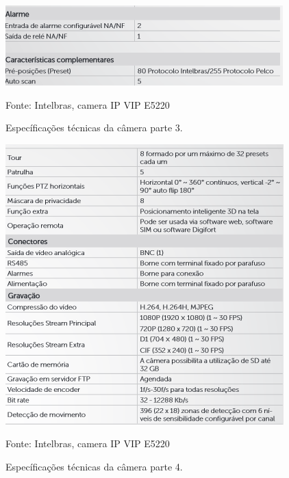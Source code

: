 \begin{itemize}
\begin{itemize}
	\begin{figure}[H]
	 \centering
	\label{Específicações técnicas da câmera parte 3}
	 \includegraphics[keepaspectratio=true,scale=0.8]{monitoramento/11.png}
	 \caption{Específicações técnicas da câmera parte 3.}
	 \small{Fonte: Intelbras, camera IP VIP E5220}
	\end{figure}
	
	\begin{figure}[H]
	 \centering
	\label{Específicações técnicas da câmera parte 4}
	 \includegraphics[keepaspectratio=true,scale=0.8]{monitoramento/12.png}
	 \caption{Específicações técnicas da câmera parte 4.}
	 \small{Fonte: Intelbras, camera IP VIP E5220}
	\end{figure}
	

\end{itemize}
\end{itemize}
